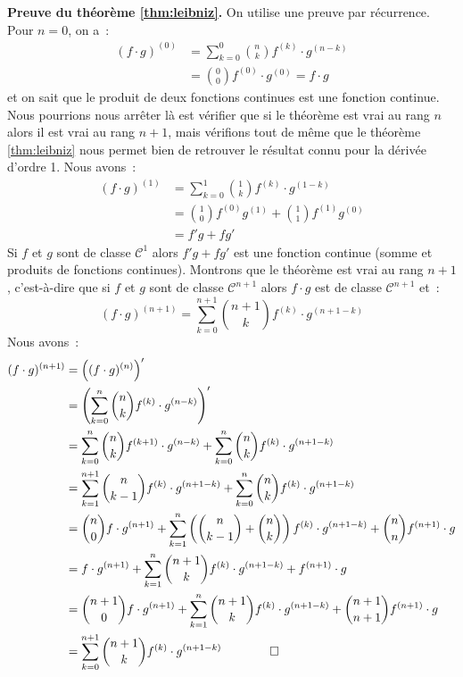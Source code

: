 \documentclass[10pt,notheorems]{beamer}
\theoremstyle{plain}
\theoremstyle{definition} %
\begin{document}
\begin{notes}

  \textbf{Preuve du théorème \hyperlink{slide_derivees_ordre_n_4}{\ref{thm:leibniz}}.} On utilise une preuve par récurrence. Pour $n=0$, on a~:
  \[
    \begin{split}
      (f\cdot g)^{(0)} &= \sum_{k=0}^0 \binom{n}{k}f^{(k)}\cdot g^{(n-k)}\\
      &= \binom{0}{0}f^{(0)}\cdot g^{(0)} = f \cdot g
    \end{split}
  \]
  et on sait que le produit de deux fonctions continues est une fonction continue. Nous pourrions nous arrêter là est vérifier que si le théorème est vrai au rang $n$ alors il est vrai au rang $n+1$, mais vérifions tout de même que le théorème \hyperlink{slide_derivees_ordre_n_4}{\ref{thm:leibniz}} nous permet bien de retrouver le résultat connu pour la dérivée d'ordre 1. Nous avons~:
  \[
    \begin{split}
      (f\cdot g)^{(1)} &= \sum_{k=0}^1 \binom{1}{k}f^{(k)}\cdot g^{(1-k)}\\
      &= \binom{1}{0}f^{(0)}g^{(1)}+\binom{1}{1}f^{(1)}g^{(0)}\\
      &= f'g+fg'
    \end{split}
  \]
  Si $f$ et $g$ sont de classe $\mathcal C^1$ alors $f'g+fg'$ est une fonction continue (somme et produits de fonctions continues). Montrons que le théorème est vrai au rang $n+1$, c'est-à-dire que si $f$ et $g$ sont de classe $\mathcal C^{n+1}$ alors $f\cdot g$ est de classe $\mathcal C^{n+1}$ et~:
  \[
    (f\cdot g)^{(n+1)} = \sum_{k=0}^{n+1} \binom{n+1}{k}f^{(k)}\cdot g^{(n+1-k)}
  \]
  Nous avons~:
  \[
    \begin{split}
      (f\cdot g)^{(n+1)} &= \left((f\cdot g)^{(n)}\right)'\\
      &= \left(\sum_{k=0}^{n} \binom{n}{k}f^{(k)}\cdot g^{(n-k)}\right)'\\
      &= \sum_{k=0}^{n} \binom{n}{k}f^{(k+1)}\cdot g^{(n-k)}+ \sum_{k=0}^{n}\binom{n}{k}f^{(k)}\cdot g^{(n+1-k)}\\
      &= \sum_{k=1}^{n+1} \binom{n}{k-1}f^{(k)}\cdot g^{(n+1-k)}+ \sum_{k=0}^{n}\binom{n}{k}f^{(k)}\cdot g^{(n+1-k)}\\
      &= \binom{n}{0}f\cdot g^{(n+1)} + \sum_{k=1}^n\left(\binom{n}{k-1}+\binom{n}{k}\right)f^{(k)}\cdot g^{(n+1-k)} + \binom{n}{n}f^{(n+1)}\cdot g\\
      &= f\cdot g^{(n+1)} + \sum_{k=1}^n\binom{n+1}{k}f^{(k)}\cdot g^{(n+1-k)} + f^{(n+1)}\cdot g\\
      &= \binom{n+1}{0}f\cdot g^{(n+1)} + \sum_{k=1}^n\binom{n+1}{k}f^{(k)}\cdot g^{(n+1-k)} + \binom{n+1}{n+1}f^{(n+1)}\cdot g\\
      &= \sum_{k=0}^{n+1}\binom{n+1}{k}f^{(k)}\cdot g^{(n+1-k)}\quad\quad \qed
    \end{split}
  \]

\end{notes}
\end{document}
